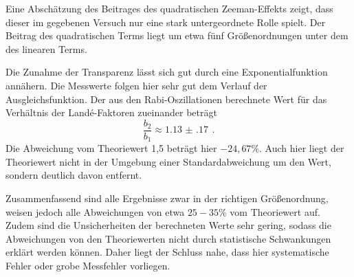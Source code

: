 Eine Abschätzung des Beitrages des quadratischen Zeeman-Effekts zeigt, dass
dieser im gegebenen Versuch nur eine stark untergeordnete Rolle spielt. Der Beitrag des
quadratischen Terms liegt um etwa fünf Größenordnungen unter dem des linearen Terms.

Die Zunahme der Transparenz lässt sich gut durch eine Exponentialfunktion
annähern. Die Messwerte folgen hier sehr gut dem Verlauf der Ausgleichsfunktion.
Der aus den Rabi-Oszillationen berechnete Wert für das Verhältnis der Landé-Faktoren zueinander
beträgt
\begin{equation*}
  \frac{b_2}{b_1}\approx\SI{1.13(17)}{} \,.
\end{equation*}
Die Abweichung vom Theoriewert 1{,}5 beträgt hier $-24{,}67\%$.
Auch hier liegt der Theoriewert nicht in der Umgebung einer Standardabweichung um den Wert, sondern
deutlich davon entfernt.

Zusammenfassend sind alle Ergebnisse zwar in der richtigen Größenordnung, weisen jedoch alle
Abweichungen von etwa $25-35\%$ vom Theoriewert auf. Zudem sind die Unsicherheiten der berechneten
Werte sehr gering, sodass die Abweichungen von den Theoriewerten nicht durch statistische
Schwankungen erklärt werden können. Daher liegt der Schluss nahe, dass hier systematische Fehler
oder grobe Messfehler vorliegen.
